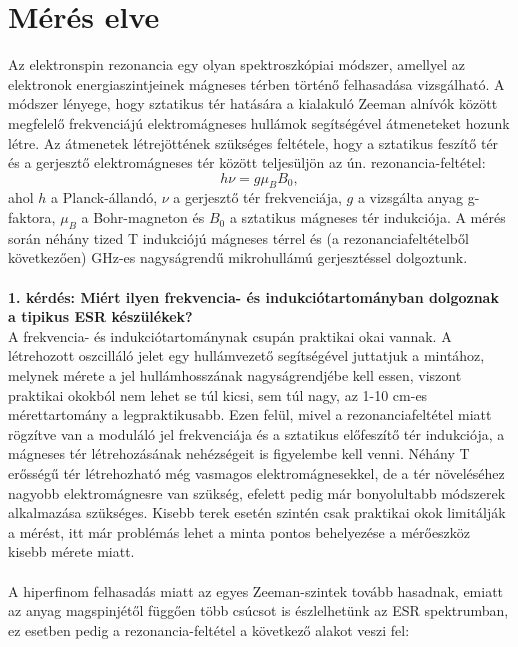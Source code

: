 \documentclass[12pt,a4paper]{article}
\begin{document}
\section{Mérés elve}
\hspace*{10pt} Az elektronspin rezonancia egy olyan spektroszkópiai módszer, amellyel az elektronok energiaszintjeinek mágneses térben történő felhasadása vizsgálható. A módszer lényege, hogy sztatikus tér hatására a kialakuló Zeeman alnívók között megfelelő frekvenciájú elektromágneses hullámok segítségével átmeneteket hozunk létre. Az átmenetek létrejöttének szükséges feltétele, hogy a sztatikus feszítő tér és a gerjesztő elektromágneses tér között teljesüljön az ún. rezonancia-feltétel:
\begin{equation}
h\nu=g\mu_{B}B_0,
\end{equation}
ahol $h$ a Planck-állandó, $\nu$ a gerjesztő tér frekvenciája, $g$ a vizsgálta anyag g-faktora, $\mu_{B}$ a Bohr-magneton és $B_{0}$ a sztatikus mágneses tér indukciója. A mérés során néhány tized T indukciójú mágneses térrel és (a rezonanciafeltételből következően) GHz-es nagyságrendű mikrohullámú gerjesztéssel dolgoztunk.\\
\\
\textbf{1. kérdés: Miért ilyen frekvencia- és indukciótartományban dolgoznak a tipikus ESR készülékek?}\\
\hspace*{10pt} A frekvencia- és indukciótartománynak csupán praktikai okai vannak. A létrehozott oszcilláló jelet egy hullámvezető segítségével juttatjuk a mintához, melynek mérete a jel hullámhosszának nagyságrendjébe kell essen, viszont praktikai okokból nem lehet se túl kicsi, sem túl nagy, az 1-10 cm-es mérettartomány a legpraktikusabb. Ezen felül, mivel a rezonanciafeltétel miatt rögzítve van a moduláló jel frekvenciája és a sztatikus előfeszítő tér indukciója, a mágneses tér létrehozásának nehézségeit is figyelembe kell venni. Néhány T erősségű tér létrehozható még vasmagos elektromágnesekkel, de a tér növeléséhez nagyobb elektromágnesre van szükség, efelett pedig már bonyolultabb módszerek alkalmazása szükséges. Kisebb terek esetén szintén csak praktikai okok limitálják a mérést, itt már problémás lehet a minta pontos behelyezése a mérőeszköz kisebb mérete miatt.\\
\\
\hspace*{10pt}  A hiperfinom felhasadás miatt az egyes Zeeman-szintek tovább hasadnak, emiatt az anyag magspinjétől függően több csúcsot is észlelhetünk az ESR spektrumban, ez esetben pedig a rezonancia-feltétel a következő alakot veszi fel:
\end{document}
